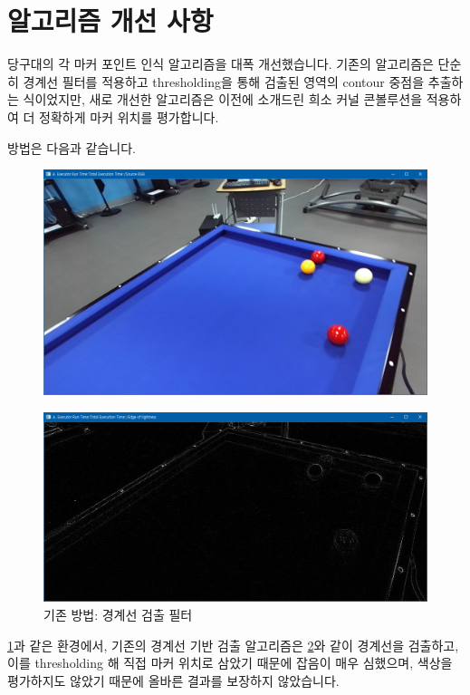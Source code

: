 \documentclass[10pt]{oblivoir}
\begin{document}
\section{알고리즘 개선 사항}

당구대의 각 마커 포인트 인식 알고리즘을 대폭 개선했습니다. 기존의 알고리즘은 단순히 경계선 필터를 적용하고 thresholding을 통해 검출된 영역의 contour 중점을 추출하는 식이었지만, 새로 개선한 알고리즘은 이전에 소개드린 희소 커널 콘볼루션을 적용하여 더 정확하게 마커 위치를 평가합니다.

방법은 다음과 같습니다.

\begin{figure}[ht]
    \centering
    \includegraphics[width=12cm]{img/sample-view.png}
    \caption{}
    \label{fig;sample-0}
\end{figure}

\begin{figure}[ht]
    \centering
    \includegraphics[width=\textwidth]{img/sobel.png}
    \caption{기존 방법: 경계선 검출 필터}
    \label{fig;old-edge}
\end{figure}

\cref{fig;sample-0}과 같은 환경에서, 기존의 경계선 기반 검출 알고리즘은 \cref{fig;old-edge}와 같이 경계선을 검출하고, 이를 thresholding 해 직접 마커 위치로 삼았기 때문에 잡음이 매우 심했으며, 색상을 평가하지도 않았기 때문에 올바른 결과를 보장하지 않았습니다.
\end{document}
